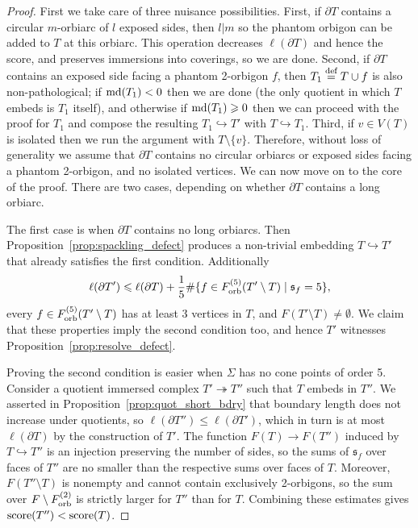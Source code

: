 \documentclass{amsart}
\newcommand{\defeq}{\stackrel{\tn{def}}{=}}
\newcommand{\Forb}[1][m]{F^{(#1)}_{\textnormal{orb}}}
\newcommand{\md}{\textnormal{md}}
\newcommand{\tn}{\textnormal}
\begin{document}
\begin{proof}
First we take care of three nuisance possibilities. First, if $\partial T$ contains a circular $m$-orbiarc of $l$ exposed sides, then $l|m$ so the phantom orbigon can be added to $T$ at this orbiarc. This operation decreases $\ell(\partial T)$ and hence the score, and preserves immersions into coverings, so we are done. Second, if $\partial T$ contains an exposed side facing a phantom 2-orbigon $f$, then $T_1\defeq T\cup f$ is also non-pathological; if $\md(T_1)<0$ then we are done (the only quotient in which $T$ embeds is $T_1$ itself), and otherwise if $\md(T_1)\geqslant0$ then we can proceed with the proof for $T_1$ and compose the resulting $T_1\hookrightarrow T'$ with $T\hookrightarrow T_1$. Third, if $v\in V(T)$ is isolated then we run the argument with $T\setminus\{v\}$. Therefore, without loss of generality we assume that $\partial T$ contains no circular orbiarcs or exposed sides facing a phantom 2-orbigon, and no isolated vertices. We can now move on to the core of the proof. There are two cases, depending on whether $\partial T$ contains a long orbiarc.

The first case is when $\partial T$ contains no long orbiarcs. Then Proposition~\ref{prop:spackling_defect} produces a non-trivial embedding $T\hookrightarrow T'$ that already satisfies the first condition. Additionally
\begin{equation*}
\ell(\partial T')\leqslant\ell(\partial T)+\frac{1}{5}\#\{f\in\Forb[5](T'\setminus T)\mid\mathfrak{s}_f=5\},
\end{equation*}
every $f\in\Forb[5](T'\setminus T)$ has at least 3 vertices in $T$, and $F(T'\setminus T)\neq\emptyset$. We claim that these properties imply the second condition too, and hence $T'$ witnesses Proposition~\ref{prop:resolve_defect}.

Proving the second condition is easier when $\Sigma$ has no cone points of order 5. Consider a quotient immersed complex $T'\twoheadrightarrow T''$ such that $T$ embeds in $T''$. We asserted in Proposition~\ref{prop:quot_short_bdry} that boundary length does not increase under quotients, so $\ell(\partial T'')\leqslant\ell(\partial T')$, which in turn is at most $\ell(\partial T)$ by the construction of $T'$. The function $F(T)\to F(T'')$ induced by $T\hookrightarrow T''$ is an injection preserving the number of sides, so the sums of $\mathfrak{s}_f$ over faces of $T''$ are no smaller than the respective sums over faces of $T$. Moreover, $F(T''\setminus T)$ is nonempty and cannot contain exclusively 2-orbigons, so the sum over $F\setminus\Forb[2]$ is strictly larger for $T''$ than for $T$. Combining these estimates gives $\tn{score}(T'')<\tn{score}(T)$.


\end{proof}
\end{document}
